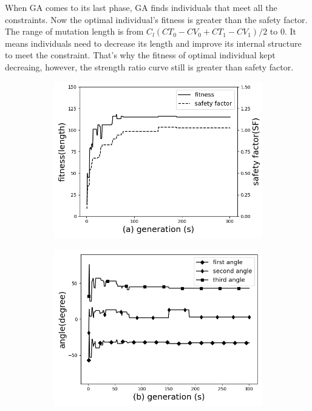 When GA comes to its last phase, GA finds individuals that meet all the
constraints.  Now the optimal individual's fitness is greater than the safety
factor. The range of mutation length is from $C_l(CT_0 - CV_0 + CT_1 - CV_1)/2$
to 0. It means individuals need to decrease its length and improve its internal
structure to meet the constraint. That's why the fitness of optimal individual
kept decreaing, however, the strength ratio curve still is greater than safety
factor.

\begin{figure}[!t]
	\centering
		\begin{subfigure}[b]{0.8\linewidth}
			\includegraphics[width=\linewidth]{2020-11-10-pre-image/Three_distinct_angles_fitness_and_sr.png}
		\end{subfigure}

		\begin{subfigure}[b]{0.8\linewidth}
			\includegraphics[width=\linewidth]{2020-11-10-pre-image/three_distinct_angles_angle_change.png}
		\end{subfigure}


\end{figure}
